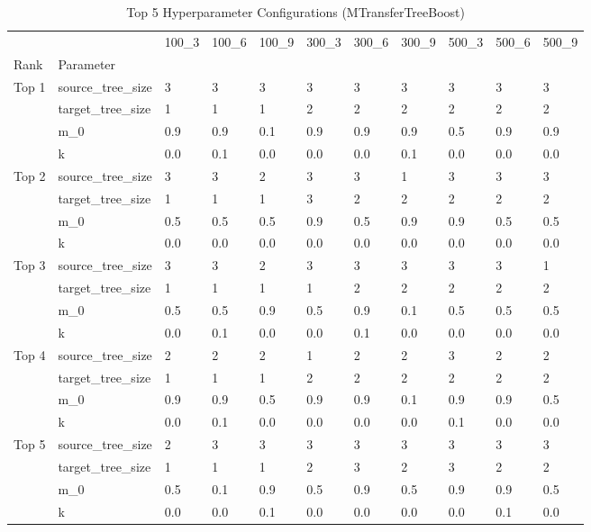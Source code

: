 \begin{table}
\caption{Top 5 Hyperparameter Configurations (MTransferTreeBoost)}
\label{tab:big_table}
\begin{tabular}{lllllllllll}
\toprule
 &  & 100\_3 & 100\_6 & 100\_9 & 300\_3 & 300\_6 & 300\_9 & 500\_3 & 500\_6 & 500\_9 \\
Rank & Parameter &  &  &  &  &  &  &  &  &  \\
\midrule
\multirow[t]{4}{*}{Top 1} & source\_tree\_size & 3 & 3 & 3 & 3 & 3 & 3 & 3 & 3 & 3 \\
 & target\_tree\_size & 1 & 1 & 1 & 2 & 2 & 2 & 2 & 2 & 2 \\
 & m\_0 & 0.9 & 0.9 & 0.1 & 0.9 & 0.9 & 0.9 & 0.5 & 0.9 & 0.9 \\
 & k & 0.0 & 0.1 & 0.0 & 0.0 & 0.0 & 0.1 & 0.0 & 0.0 & 0.0 \\
\cline{1-11}
\multirow[t]{4}{*}{Top 2} & source\_tree\_size & 3 & 3 & 2 & 3 & 3 & 1 & 3 & 3 & 3 \\
 & target\_tree\_size & 1 & 1 & 1 & 3 & 2 & 2 & 2 & 2 & 2 \\
 & m\_0 & 0.5 & 0.5 & 0.5 & 0.9 & 0.5 & 0.9 & 0.9 & 0.5 & 0.5 \\
 & k & 0.0 & 0.0 & 0.0 & 0.0 & 0.0 & 0.0 & 0.0 & 0.0 & 0.0 \\
\cline{1-11}
\multirow[t]{4}{*}{Top 3} & source\_tree\_size & 3 & 3 & 2 & 3 & 3 & 3 & 3 & 3 & 1 \\
 & target\_tree\_size & 1 & 1 & 1 & 1 & 2 & 2 & 2 & 2 & 2 \\
 & m\_0 & 0.5 & 0.5 & 0.9 & 0.5 & 0.9 & 0.1 & 0.5 & 0.5 & 0.5 \\
 & k & 0.0 & 0.1 & 0.0 & 0.0 & 0.1 & 0.0 & 0.0 & 0.0 & 0.0 \\
\cline{1-11}
\multirow[t]{4}{*}{Top 4} & source\_tree\_size & 2 & 2 & 2 & 1 & 2 & 2 & 3 & 2 & 2 \\
 & target\_tree\_size & 1 & 1 & 1 & 2 & 2 & 2 & 2 & 2 & 2 \\
 & m\_0 & 0.9 & 0.9 & 0.5 & 0.9 & 0.9 & 0.1 & 0.9 & 0.9 & 0.5 \\
 & k & 0.0 & 0.1 & 0.0 & 0.0 & 0.0 & 0.0 & 0.1 & 0.0 & 0.0 \\
\cline{1-11}
\multirow[t]{4}{*}{Top 5} & source\_tree\_size & 2 & 3 & 3 & 3 & 3 & 3 & 3 & 3 & 3 \\
 & target\_tree\_size & 1 & 1 & 1 & 2 & 3 & 2 & 3 & 2 & 2 \\
 & m\_0 & 0.5 & 0.1 & 0.9 & 0.5 & 0.9 & 0.5 & 0.9 & 0.9 & 0.5 \\
 & k & 0.0 & 0.0 & 0.1 & 0.0 & 0.0 & 0.0 & 0.0 & 0.1 & 0.0 \\
\cline{1-11}
\bottomrule
\end{tabular}
\end{table}
